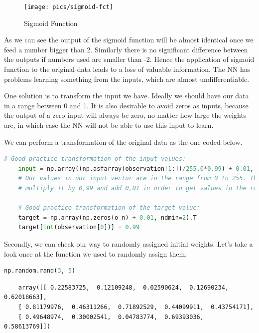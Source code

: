 \begin{figure}[H]
    \texttt{[image: pics/sigmoid-fct]}
    \caption{\label{fig:sigmoid-fct} Sigmoid Function}
\end{figure}

As we can see the output of the sigmoid function will be almost identical once we feed a number bigger than 2. Similarly there is no significant difference between the outputs if numbers used are smaller than -2. Hence the application of sigmoid function to the original data leads to a loss of valuable information. The NN has problems learning something from the inputs, which are almost undifferentiable.  

One solution is to transform the input we have. Ideally we should have our data in a range between 0 and 1. It is also desirable to avoid zeros as inputs, because the output of a zero input will always be zero, no matter how large the weights are, in which case the NN will not be able to use this input to learn.

We can perform a transformation of the original data as the one coded below.

\begin{lstlisting}[language=Python]
    # Good practice transformation of the input values:
    input = np.array((np.asfarray(observation[1:])/255.0*0.99) + 0.01, ndmin=2).T 
    # Our values in our input vector are in the range from 0 to 255. Therefore we should divide input vector by 255, 
    # multiply it by 0,99 and add 0,01 in order to get values in the range from 0,01 to 1.
    
    # Good practice transformation of the target value:
    target = np.array(np.zeros(o_n) + 0.01, ndmin=2).T
    target[int(observation[0])] = 0.99
\end{lstlisting}

Secondly, we can check our way to randomly assigned initial weights. Let's take a look once at the function we used to randomly assign them.

\begin{lstlisting}[language=Python]
    np.random.rand(3, 5)
\end{lstlisting}

\begin{lstlisting}
    array([[ 0.22583725,  0.12109248,  0.02590624,  0.12690234,  0.62018663],
    [ 0.81179976,  0.46311266,  0.71892529,  0.44099911,  0.43754171],
    [ 0.49648974,  0.30002541,  0.04783774,  0.69393036,  0.58613769]])
\end{lstlisting}

